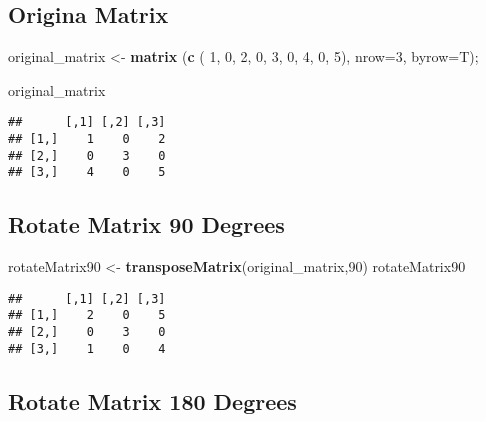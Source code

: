 \documentclass{article}
\newenvironment{Shaded}{\begin{snugshade}}{\end{snugshade}}
\newcommand{\DataTypeTok}[1]{\textcolor[rgb]{0.13,0.29,0.53}{#1}}
\newcommand{\DecValTok}[1]{\textcolor[rgb]{0.00,0.00,0.81}{#1}}
\newcommand{\KeywordTok}[1]{\textcolor[rgb]{0.13,0.29,0.53}{\textbf{#1}}}
\newcommand{\NormalTok}[1]{#1}
\newcommand{\StringTok}[1]{\textcolor[rgb]{0.31,0.60,0.02}{#1}}
\begin{document}
\hypertarget{origina-matrix}{%
\subsection{Origina Matrix}\label{origina-matrix}}

\begin{Shaded}
\begin{Highlighting}[]
\NormalTok{original_matrix <-}\StringTok{  }\KeywordTok{matrix}\NormalTok{ (}\KeywordTok{c}\NormalTok{ ( }\DecValTok{1}\NormalTok{, }\DecValTok{0}\NormalTok{, }\DecValTok{2}\NormalTok{,}
                               \DecValTok{0}\NormalTok{, }\DecValTok{3}\NormalTok{, }\DecValTok{0}\NormalTok{,}
                               \DecValTok{4}\NormalTok{, }\DecValTok{0}\NormalTok{, }\DecValTok{5}\NormalTok{), }\DataTypeTok{nrow=}\DecValTok{3}\NormalTok{, }\DataTypeTok{byrow=}\NormalTok{T);}



\NormalTok{original_matrix }
\end{Highlighting}
\end{Shaded}

\begin{verbatim}
##      [,1] [,2] [,3]
## [1,]    1    0    2
## [2,]    0    3    0
## [3,]    4    0    5
\end{verbatim}

\hypertarget{rotate-matrix-90-degrees}{%
\subsection{\texorpdfstring{\textbf{Rotate Matrix 90
Degrees}}{Rotate Matrix 90 Degrees}}\label{rotate-matrix-90-degrees}}

\begin{Shaded}
\begin{Highlighting}[]
\NormalTok{rotateMatrix90 <-}\StringTok{ }\KeywordTok{transposeMatrix}\NormalTok{(original_matrix,}\DecValTok{90}\NormalTok{)}
\NormalTok{rotateMatrix90}
\end{Highlighting}
\end{Shaded}

\begin{verbatim}
##      [,1] [,2] [,3]
## [1,]    2    0    5
## [2,]    0    3    0
## [3,]    1    0    4
\end{verbatim}

\hypertarget{rotate-matrix-180-degrees}{%
\subsection{\texorpdfstring{\textbf{Rotate Matrix 180
Degrees}}{Rotate Matrix 180 Degrees}}\label{rotate-matrix-180-degrees}}
\end{document}
